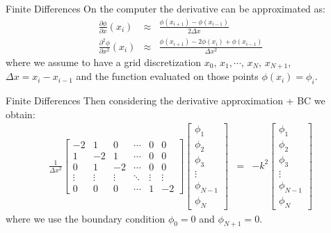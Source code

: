 \documentclass[aspectratio=169]{beamer}
\begin{document}
\begin{frame}{Finite Differences}
    On the computer the derivative can be approximated as:
    \begin{eqnarray}
        \frac{\partial \phi}{\partial x}(x_i) & \approx & \frac{\phi(x_{i+1}) - \phi(x_{i-1})}{2\Delta x} \\
        \frac{\partial^2 \phi}{\partial x^2}(x_i) & \approx & \frac{\phi(x_{i+1}) - 2 \phi(x_{i}) + \phi(x_{i-1})}{\Delta x ^2}
    \end{eqnarray}
    where we assume to have a grid discretization ${x_0,\, x_1,\cdots,\,x_N,\,x_{N+1}}$, $\Delta x = x_i - x_{i-1}$ and the function evaluated 
    on those points $\phi(x_i) = \phi_i$.
\end{frame}

\begin{frame}{Finite Differences}
    Then considering the derivative approximation + BC we obtain:
    \begin{eqnarray}
        \frac{1}{\Delta x^2}\begin{bmatrix}
            -2 & 1 & 0 & \cdots & 0 & 0\\
            1 & -2 & 1 & \cdots & 0 & 0\\  
            0 & 1 & -2 & \cdots & 0 & 0\\      
            \vdots & \vdots & \vdots & \ddots & \vdots & \vdots \\
            0 & 0 & 0 & \cdots & 1 & -2
        \end{bmatrix}
        \begin{bmatrix}
            \phi_1 \\  \phi_2 \\  \phi_3 \\ \vdots \\ \phi_{N-1} \\  \phi_N 
        \end{bmatrix} 
        & = &
        -k^2 
        \begin{bmatrix}
            \phi_1 \\  \phi_2 \\  \phi_3 \\ \vdots \\ \phi_{N-1} \\  \phi_N 
        \end{bmatrix} 
    \end{eqnarray}
    where we use the boundary condition $\phi_0=0$ and $\phi_{N+1}=0$.
\end{frame}
\end{document}
